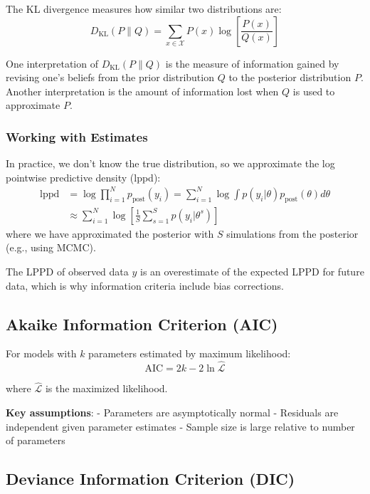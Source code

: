 \documentclass[
  letterpaper,
  DIV=11,
  numbers=noendperiod]{scrreprt}
\begin{document}
The KL divergence measures how similar two distributions are: \[
D_\text{KL} (P \parallel Q) = \sum_{x \in \mathcal{X}} P(x) \log \left[ \frac{P(x)}{Q(x)} \right]
\]

One interpretation of \(D_\text{KL} (P \parallel Q)\) is the measure of
information gained by revising one's beliefs from the prior distribution
\(Q\) to the posterior distribution \(P\). Another interpretation is the
amount of information lost when \(Q\) is used to approximate \(P\).

\subsubsection{Working with Estimates}\label{working-with-estimates}

In practice, we don't know the true distribution, so we approximate the
log pointwise predictive density (lppd): \[
\begin{align}
\text{lppd} &= \log \prod_{i=1}^N p_\text{post}(y_i) = \sum_{i=1}^N \log \int p(y_i | \theta) p_\text{post} (\theta) d \theta \\
&\approx \sum_{i=1}^N \log \left[ \frac{1}{S} \sum_{s=1}^S p(y_i | \theta^s) \right]
\end{align}
\] where we have approximated the posterior with \(S\) simulations from
the posterior (e.g., using MCMC).

The LPPD of observed data \(y\) is an overestimate of the expected LPPD
for future data, which is why information criteria include bias
corrections.

\subsection{Akaike Information Criterion
(AIC)}\label{akaike-information-criterion-aic}

For models with \(k\) parameters estimated by maximum likelihood: \[
\text{AIC} = 2k - 2\ln\hat{\mathcal{L}}
\]

where \(\hat{\mathcal{L}}\) is the maximized likelihood.

\textbf{Key assumptions}: - Parameters are asymptotically normal -
Residuals are independent given parameter estimates - Sample size is
large relative to number of parameters

\subsection{Deviance Information Criterion
(DIC)}\label{deviance-information-criterion-dic}
\end{document}
